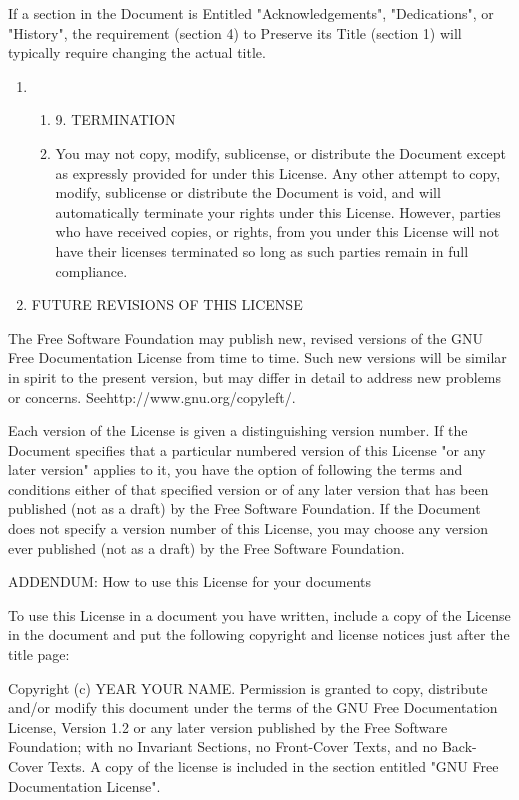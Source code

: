 \documentclass{article}
\begin{document}
If a section in the Document is Entitled "Acknowledgements", "Dedications", or "History", the requirement (section 4) to Preserve its Title (section 1) will typically require changing the actual title. 

\begin{enumerate}
\item \begin{enumerate}
\item  9. TERMINATION 

\item  You may not copy, modify, sublicense, or distribute the Document except as expressly provided for under this License. Any other attempt to copy, modify, sublicense or distribute the Document is void, and will automatically terminate your rights under this License. However, parties who have received copies, or rights, from you under this License will not have their licenses terminated so long as such parties remain in full compliance. 
\end{enumerate}

\item  FUTURE REVISIONS OF THIS LICENSE 
\end{enumerate}



The Free Software Foundation may publish new, revised versions of the GNU Free Documentation License from time to time. Such new versions will be similar in spirit to the present version, but may differ in detail to address new problems or concerns.  Seehttp://www.gnu.org/copyleft/. 

Each version of the License is given a distinguishing version number. If the Document specifies that a particular numbered version of this License "or any later version" applies to it, you have the option of following the terms and conditions either of that specified version or of any later version that has been published (not as a draft) by the Free Software Foundation. If the Document does not specify a version number of this License, you may choose any version ever published (not as a draft) by the Free Software Foundation. 

ADDENDUM: How to use this License for your documents 

To use this License in a document you have written, include a copy of the License in the document and put the following copyright and license notices just after the title page: 

Copyright (c)  YEAR  YOUR NAME. Permission is granted to copy, distribute and/or modify this document under the terms of the GNU Free Documentation License, Version 1.2 or any later version published by the Free Software Foundation; with no Invariant Sections, no Front-Cover Texts, and no Back-Cover Texts. A copy of the license is included in the section entitled "GNU Free Documentation License". 
\end{document}
